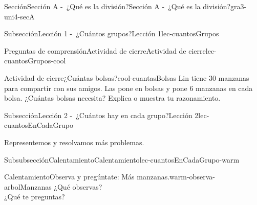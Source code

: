 \documentclass[twoside,10pt,]{article}
\begin{document}
\begin{sectionptx}{Sección}{Sección A -~¿Qué es la división?}{}{Sección A -~¿Qué es la división?}{}{}{gra3-uni4-secA}
\begin{subsectionptx}{Subsección}{Lección 1 -~¿Cuántos grupos?}{}{Lección 1}{}{}{lec-cuantosGrupos}
\begin{reading-questions-subsubsection}{Preguntas de comprensión}{Actividad de cierre}{}{Actividad de cierre}{}{}{lec-cuantosGrupos-cool}
\begin{project}{Actividad de cierre}{¿Cuántas bolsas?}{cool-cuantasBolsas}
Lin tiene 30 manzanas para compartir con sus amigos. Las pone en bolsas y pone 6 manzanas en cada bolsa. ¿Cuántas bolsas necesita? Explica o muestra tu razonamiento.%
\end{project}%
\end{reading-questions-subsubsection}
\end{subsectionptx}
%
%
\typeout{************************************************}
\typeout{************************************************}
%
\begin{subsectionptx}{Subsección}{Lección 2 -~¿Cuántos hay en cada grupo?}{}{Lección 2}{}{}{lec-cuantosEnCadaGrupo}
\begin{introduction}{}%
Representemos y resolvamos más problemas.%
\end{introduction}%
%
%
\typeout{************************************************}
\typeout{************************************************}
%
\begin{subsubsectionptx}{Subsubsección}{Calentamiento}{}{Calentamiento}{}{}{lec-cuantosEnCadaGrupo-warm}
\begin{exploration}{Calentamiento}{Observa y pregúntate: Más manzanas.}{warm-observa-arbolManzanas}%
¿Qué observas?\\
 ¿Qué te preguntas?%
\begin{image}{0.15}{0.7}{0.15}{}%

\end{image}
\end{exploration}
\end{subsubsectionptx}
\end{subsectionptx}
\end{sectionptx}
\end{document}
